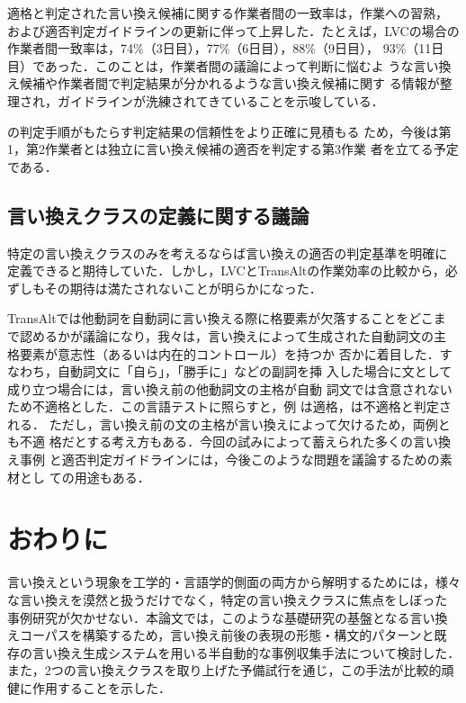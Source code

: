 適格と判定された言い換え候補に関する作業者間の一致率は，作業への習熟，
および適否判定ガイドラインの更新に伴って上昇した．たとえば，LVCの場合の
作業者間一致率は，74\%（3日目），77\%（6日目），88\%（9日目），
93\%（11日目）であった．このことは，作業者間の議論によって判断に悩むよ
うな言い換え候補や作業者間で判定結果が分かれるような言い換え候補に関す
る情報が整理され，ガイドラインが洗練されてきていることを示唆している．

の判定手順がもたらす判定結果の信頼性をより正確に見積もる
ため，今後は第1，第2作業者とは独立に言い換え候補の適否を判定する第3作業
者を立てる予定である．

\subsection{言い換えクラスの定義に関する議論}
\label{ssec:definition}

特定の言い換えクラスのみを考えるならば言い換えの適否の判定基準を明確に
定義できると期待していた．しかし，LVCとTransAltの作業効率の比較から，必
ずしもその期待は満たされないことが明らかになった．

TransAltでは他動詞を自動詞に言い換える際に格要素が欠落することをどこま
で認めるかが議論になり，我々は，言い換えによって生成された自動詞文の主
格要素が意志性（あるいは内在的コントロール\cite{kageyama:96}）を持つか
否かに着目した．すなわち，自動詞文に「自ら」，「勝手に」などの副詞を挿
入した場合に文として成り立つ場合には，言い換え前の他動詞文の主格が自動
詞文では含意されないため不適格とした．この言語テストに照らすと，例
は適格，は不適格と判定される．
ただし，言い換え前の文の主格が言い換えによって欠けるため，両例とも不適
格だとする考え方もある．今回の試みによって蓄えられた多くの言い換え事例
と適否判定ガイドラインには，今後このような問題を議論するための素材とし
ての用途もある．

\section{おわりに}
\label{sec:conclusion}

言い換えという現象を工学的・言語学的側面の両方から解明するためには，様々
な言い換えを漠然と扱うだけでなく，特定の言い換えクラスに焦点をしぼった
事例研究が欠かせない．本論文では，このような基礎研究の基盤となる言い換
えコーパスを構築するため，言い換え前後の表現の形態・構文的パターンと既
存の言い換え生成システムを用いる半自動的な事例収集手法について検討した．
また，2つの言い換えクラスを取り上げた予備試行を通じ，この手法が比較的頑
健に作用することを示した．

